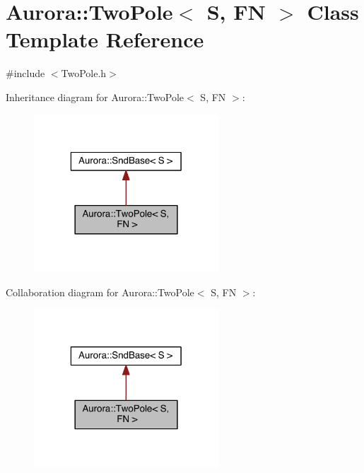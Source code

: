 \hypertarget{class_aurora_1_1_two_pole}{}\section{Aurora\+:\+:Two\+Pole$<$ S, FN $>$ Class Template Reference}
\label{class_aurora_1_1_two_pole}


{\ttfamily \#include $<$Two\+Pole.\+h$>$}



Inheritance diagram for Aurora\+:\+:Two\+Pole$<$ S, FN $>$\+:\nopagebreak
\begin{figure}[H]
\begin{center}
\leavevmode
\includegraphics[width=196pt]{class_aurora_1_1_two_pole__inherit__graph}
\end{center}
\end{figure}


Collaboration diagram for Aurora\+:\+:Two\+Pole$<$ S, FN $>$\+:\nopagebreak
\begin{figure}[H]
\begin{center}
\leavevmode
\includegraphics[width=196pt]{class_aurora_1_1_two_pole__coll__graph}
\end{center}
\end{figure}
